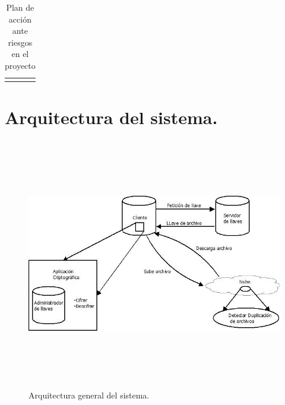\begin{longtable}{| p{1cm} | p{5cm} | p{9.5cm} |}
\\ \hline
\caption{Plan de acción ante riesgos en el proyecto}
\label{Análisis de riesgos }
\end{longtable}



\section{Arquitectura del sistema. }

\begin{figure}[H]
\centering
	\includegraphics[width=16cm, height=11cm]{./images/Arqui.jpg}
	\caption{Arquitectura general del sistema.}

\end{figure}






